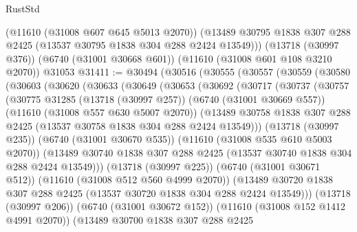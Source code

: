 \begin{lexlean}{RustStd}
\begin{coremodule}
      (@11610 (@31008 @607 @645 @5013 @2070))
      (@13489 @30795 @1838 @307 @288 @2425 (@13537 @30795 @1838 @304 @288 @2424 @13549)))
    (@13718 (@30997 @376))
    (@6740 (@31001 @30668 @601))
    (@11610 (@31008 @601 @108 @3210 @2070))
    @31053
@31411 := @30494
    (@30516
      (@30555
        (@30557
          (@30559
            (@30580
              (@30603
                (@30620
                  (@30633
                    (@30649
                      (@30653
                        (@30692
                          (@30717
                            (@30737
                              (@30757
                                (@30775
                                  @31285
                                  (@13718 (@30997 @257))
                                  (@6740 (@31001 @30669 @557))
                                  (@11610 (@31008 @557 @630 @5007 @2070))
                                  (@13489
                                    @30758
                                    @1838
                                    @307
                                    @288
                                    @2425
                                    (@13537 @30758 @1838 @304 @288 @2424 @13549)))
                                (@13718 (@30997 @235))
                                (@6740 (@31001 @30670 @535))
                                (@11610 (@31008 @535 @610 @5003 @2070))
                                (@13489
                                  @30740
                                  @1838
                                  @307
                                  @288
                                  @2425
                                  (@13537 @30740 @1838 @304 @288 @2424 @13549)))
                              (@13718 (@30997 @225))
                              (@6740 (@31001 @30671 @512))
                              (@11610 (@31008 @512 @560 @4999 @2070))
                              (@13489
                                @30720
                                @1838
                                @307
                                @288
                                @2425
                                (@13537 @30720 @1838 @304 @288 @2424 @13549)))
                            (@13718 (@30997 @206))
                            (@6740 (@31001 @30672 @152))
                            (@11610 (@31008 @152 @1412 @4991 @2070))
                            (@13489
                              @30700
                              @1838
                              @307
                              @288
                              @2425

\end{coremodule}
\end{lexlean}

